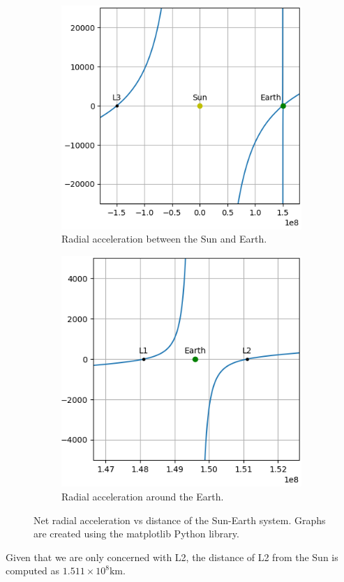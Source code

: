 \begin{figure}[H]
	\centering
	\captionsetup[subfigure]{justification=centering}
	\begin{subfigure}[b]{0.4\textwidth}
		\centering
		\includegraphics[scale=0.6]{r-accel-figure-1.png}
		\caption{\footnotesize Radial acceleration between the Sun and Earth.}
		\label{fig:radial-accel-system}
	\end{subfigure}
	\hspace*{1cm}
	\begin{subfigure}[b]{0.4\textwidth}
		\centering
		\includegraphics[scale=0.6]{r-accel-figure-2.png}
		\caption{\footnotesize Radial acceleration around the Earth.\vspace*{1.16em}}
		\label{fig:radial-accel-earth}
	\end{subfigure}
	\label{fig:radial-accel}
	\caption{Net radial acceleration vs distance of the Sun-Earth system. Graphs are created using the matplotlib Python library.}
\end{figure}
Given that we are only concerned with L2, the distance of L2 from the Sun is computed as $1.511 \times 10^8 \si{\kilo\metre}$.

